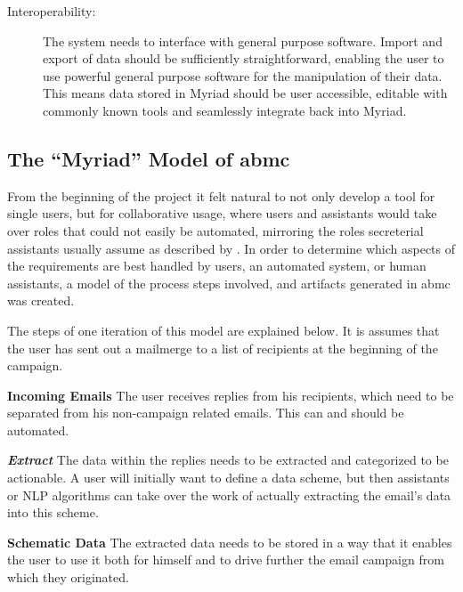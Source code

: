 \begin{description}

\item[Interoperability:] The system needs to interface with general purpose software. Import and export of data should be sufficiently straightforward, enabling the user to use powerful general purpose software for the manipulation of their data. This means data stored in Myriad should be user accessible, editable with commonly known tools and seamlessly integrate back into Myriad.

\end{description}

\subsection{The ``Myriad'' Model of \gls{abmc}}
From the beginning of the project it felt natural to not only develop a tool for single users, but for collaborative usage, where users and assistants would take over roles that could not easily be automated, mirroring the roles secreterial assistants usually assume as described by \citet{Erickson2008a}.
In order to determine which aspects of the requirements are best handled by users, an automated system, or human assistants, a model of the process steps involved, and artifacts generated in \gls{abmc} was created.


The steps of one iteration of this model are explained below. It is assumes that the user has sent out a mailmerge to a list of recipients at the beginning of the campaign.

\textbf{Incoming Emails}
The user receives replies from his recipients, which need to be separated from his non-campaign related emails. This can and should be automated.

\textbf{\emph{Extract}}
The data within the replies needs to be extracted and categorized to be actionable. A user will initially want to define a data scheme, but then assistants or NLP algorithms can take over the work of actually extracting the email's data into this scheme.

\textbf{Schematic Data}
The extracted data needs to be stored in a way that it enables the user to use it both for himself and to drive further the email campaign from which they originated.

